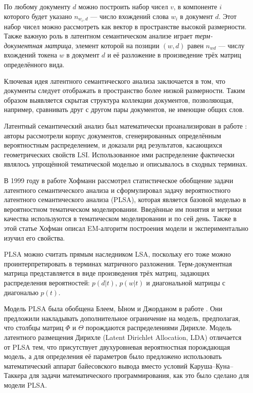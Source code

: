 По любому документу $d$ можно построить набор чисел $v$, в компоненте $i$ которого будет указано $n_{{w_i}, d}$ --- число вхождений слова $w_i$ в документ $d$. Этот набор чисел можно рассмотреть как вектор в пространстве высокой размерности. Также важную роль в латентном семантическом анализе играет \textit{терм-документная матрица}, элемент которой на позиции $(w, d)$ равен $n_{wd}$ --- числу вхождений токена $w$ в документ $d$ и её разложение в произведение трёх матриц определённого вида.

Ключевая идея латентного семантического анализа заключается в том, что документы следует отображать в пространство более низкой размерности. Таким образом выявляется скрытая структура коллекции документов, позволяющая, например, сравнивать друг с другом пары документов, не имеющие общих слов.

Латентный семантический анализ был математически проанализирован в работе \cite{papadimitriou1998latent}: авторы рассмотрели корпус документов, сгенерированных определённым вероятностным распределением, и доказали ряд результатов, касающихся геометрических свойств LSI. Использованное ими распределение фактически являлось упрощённой тематической моделью и описывалось в сходных терминах.

В 1999 году в работе \cite{hofmann1999probabilistic} Хофманн рассмотрел статистическое обобщение задачи латентного семантического анализа и сформулировал задачу вероятностного латентного семантического анализа (PLSA), которая является базовой моделью в вероятностном тематическом моделировании.
Введённые им понятия и метрики качества используются в тематическом моделировании и по сей день. Также в этой статье Хофман описал EM-алгоритм построения модели и экспериментально изучил его свойства.

PLSA можно считать прямым наследником LSA, поскольку его тоже можно проинтерпретировать в терминах матричного разложения. Терм-документная матрица представляется в виде произведения трёх матриц, задающих распределения вероятностей: $p(d|t)$, $p(w|t)$ и диагональной матрицы с диагональю $p(t)$.

Модель PLSA была обобщена Блеем, Ыном и Джорданом в работе  \cite{blei2003latent}. Они предложили накладывать дополнительное ограничение на модель, предполагая, что столбцы матриц $\Phi$ и $\Theta$ порождаются распределениями Дирихле. Модель латентного размещения Дирихле (Latent Dirichlet Allocation, LDA) отличается от PLSA тем, что присутствует двухуровневая вероятностная порождающая модель, а для определения её параметров было предложено использовать математический аппарат байесовского вывода вместо условий Каруша--Куна--Таккера для задачи математического программирования, как это было сделано для модели PLSA.

